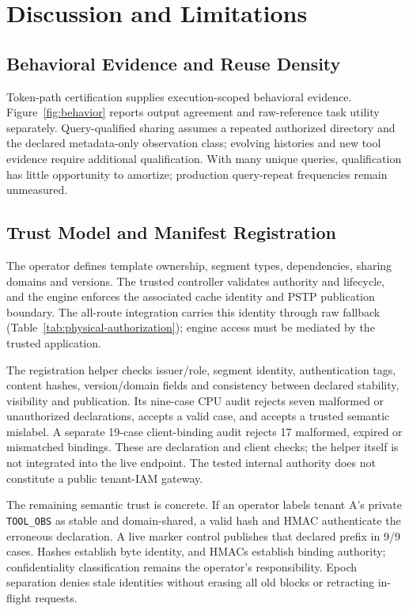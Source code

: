 \section{Discussion and Limitations}
\label{sec:discussion}
\subsection{Behavioral Evidence and Reuse Density}
Token-path certification supplies execution-scoped behavioral evidence. Figure~\ref{fig:behavior} reports output agreement and raw-reference task utility separately. Query-qualified sharing assumes a repeated authorized directory and the declared metadata-only observation class; evolving histories and new tool evidence require additional qualification. With many unique queries, qualification has little opportunity to amortize; production query-repeat frequencies remain unmeasured.

\subsection{Trust Model and Manifest Registration}
\label{sec:trust}
The operator defines template ownership, segment types, dependencies, sharing domains and versions. The trusted controller validates authority and lifecycle, and the engine enforces the associated cache identity and PSTP publication boundary. The all-route integration carries this identity through raw fallback (Table~\ref{tab:physical-authorization}); engine access must be mediated by the trusted application.

The registration helper checks issuer/role, segment identity, authentication tags, content hashes, version/domain fields and consistency between declared stability, visibility and publication. Its nine-case CPU audit rejects seven malformed or unauthorized declarations, accepts a valid case, and accepts a trusted semantic mislabel. A separate 19-case client-binding audit rejects 17 malformed, expired or mismatched bindings. These are declaration and client checks; the helper itself is not integrated into the live endpoint. The tested internal authority does not constitute a public tenant-IAM gateway.

The remaining semantic trust is concrete. If an operator labels tenant A's private \texttt{TOOL\_OBS} as stable and domain-shared, a valid hash and HMAC authenticate the erroneous declaration. A live marker control publishes that declared prefix in 9/9 cases. Hashes establish byte identity, and HMACs establish binding authority; confidentiality classification remains the operator's responsibility. Epoch separation denies stale identities without erasing all old blocks or retracting in-flight requests.

